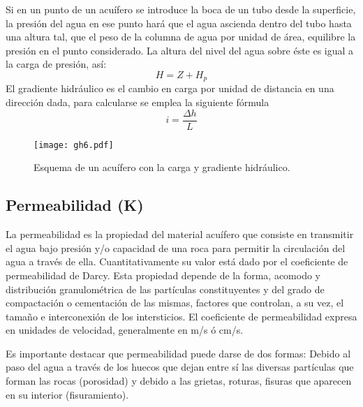 Si en un punto de un acuífero se introduce la boca de un tubo desde la superficie, la presión del agua en ese punto hará que el agua ascienda dentro del tubo hasta una altura tal, que el peso de la columna de agua por unidad de área, equilibre la presión en el punto considerado. La altura del nivel del agua sobre éste es igual a la carga de presión, así:
\begin{equation}
    H = Z + H_p
\end{equation}
El gradiente hidráulico es el cambio en carga por unidad de distancia en una dirección dada, para calcularse se emplea la siguiente fórmula
\begin{equation}
    i= \frac{\Delta h}{L}
\end{equation}
\begin{figure}[h!]
\centering
  \texttt{[image: gh6.pdf]}
  \caption{Esquema de un acuífero con la carga y gradiente hidráulico.}
  \label{gh6}
\end{figure}

\subsection{Permeabilidad (K)}
La permeabilidad es la propiedad del material acuífero que consiste en transmitir el agua bajo presión y/o capacidad de una roca para permitir la circulación del agua a través de ella. Cuantitativamente su valor está dado por el coeficiente de permeabilidad de Darcy. Esta propiedad depende de la forma, acomodo y distribución granulométrica de las partículas constituyentes y del grado de compactación o cementación de las mismas, factores que controlan, a su vez, el tamaño e interconexión de los intersticios. El coeficiente de permeabilidad expresa en unidades de velocidad, generalmente en m/s ó cm/s.

Es importante destacar que permeabilidad puede darse de dos formas: Debido al paso del agua a través de los huecos que dejan entre sí las diversas partículas que forman las rocas (porosidad) y debido a las grietas, roturas, fisuras que aparecen en su interior (fisuramiento).

